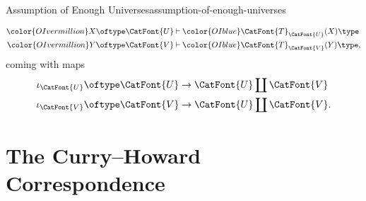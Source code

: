 \begin{remark}{Assumption of Enough Universes}{assumption-of-enough-universes}
\begin{enumerate}
{                \par\vspace*{\TCBBoxCorrection}
            }%
            \begin{align*}
                {\color{OIvermillion}X\oftype\CatFont{U}} &\mathbin{\vdash} {\color{OIblue}\CatFont{T}_{\CatFont{U}}(X)\type}\\
                {\color{OIvermillion}Y\oftype\CatFont{V}} &\mathbin{\vdash} {\color{OIblue}\CatFont{T}_{\CatFont{V}}(Y)\type},
            \end{align*}
            coming with maps
            \begin{align*}
                \iota_{\CatFont{U}} &\oftype \CatFont{U}\to\CatFont{U}\coprod\CatFont{V}\\
                \iota_{\CatFont{V}} &\oftype \CatFont{V}\to\CatFont{U}\coprod\CatFont{V}.
            \end{align*}
    \end{enumerate}
\end{remark}
\section{The Curry--Howard Correspondence}\label{section-the-curry-howard-correspondence}
